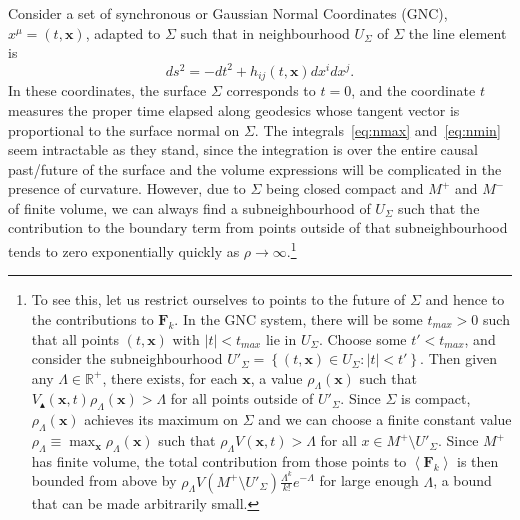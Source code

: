 \documentclass[12pt]{article}
\newcommand{\be}{\begin{equation}}
\newcommand{\ee}{\end{equation}}
\newcommand{\mb}[1]{\marginnote{\texttt{\small MB:\,#1}}}
\begin{document}
Consider a set of synchronous or Gaussian Normal Coordinates (GNC), $x^\mu= (t,\mathbf x)$, adapted to $\Sigma$ such that in neighbourhood $U_\Sigma$ of $\Sigma$ the line element is
\be
ds^2 = -dt^2 + h_{ij} (t,\mathbf x) dx^i dx^j.
\ee
In these coordinates, the surface $\Sigma$ corresponds to $t=0$, and the coordinate $t$ measures the proper time elapsed along geodesics whose tangent vector is proportional to the surface normal on $\Sigma$.
The integrals~\eqref{eq:nmax} and~\eqref{eq:nmin} seem intractable as they stand, since the integration is over the entire causal past/future of the surface and the volume expressions will be complicated in the presence of curvature. However, due to $\Sigma$ being closed compact and $M^+$ and $M^-$ of finite volume, we can always find a subneighbourhood of $U_\Sigma$ such that the contribution to the boundary term from points outside of that subneighbourhood tends to zero exponentially quickly as $\rho\rightarrow\infty$.\footnote{To see this, let us restrict ourselves to points to the future of $\Sigma$ and hence to the contributions to $\mathbf F_k$. In the GNC system, there will be some $t_{max}>0$ such that all points $(t,\mathbf x)$ with $|t|<t_{max}$ lie in $U_\Sigma$. Choose some $t'<t_{max}$, and consider the subneighbourhood $U'_\Sigma=\left\{(t,\mathbf x)\in U_\Sigma: |t|<t'\right\}$. Then given any $\Lambda\in\mathbb R^+$, there exists, for each $\mathbf x$, a value $\rho_\Lambda(\mathbf x)$ such that $V_\blacktriangle(\mathbf x, t)\rho_\Lambda(\mathbf x)>\Lambda$ for all points outside of $U'_\Sigma$. Since $\Sigma$ is compact, $\rho_\Lambda(\mathbf x)$ achieves its maximum on $\Sigma$ and we can choose a finite constant value $\rho_\Lambda\equiv\max_{\mathbf{x}}\rho_\Lambda(\mathbf x)$ such that $\rho_\Lambda V(\mathbf x, t)>\Lambda$ for all $x\in M^+\setminus U'_\Sigma$. Since $M^+$ has finite volume, the total contribution from those points to $\left<\mathbf F_k\right>$ is then bounded from above by $\rho_\Lambda V(M^+\setminus U'_\Sigma)\frac{\Lambda^k}{k!}e^{-\Lambda}$ for large enough $\Lambda$, a bound that can be made arbitrarily small.} 
\end{document}
